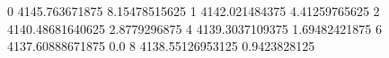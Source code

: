 0 4145.763671875 8.15478515625
1 4142.021484375 4.41259765625
2 4140.48681640625 2.8779296875
4 4139.3037109375 1.69482421875
6 4137.60888671875 0.0
8 4138.55126953125 0.9423828125
